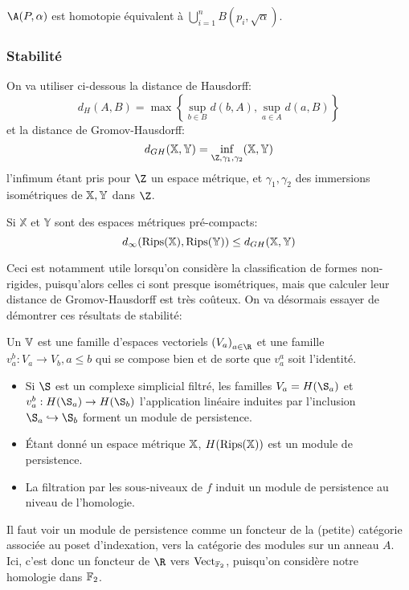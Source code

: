 \begin{thm}
	$\A(P, \alpha)$ est homotopie équivalent à $\bigcup_{i = 1}^{n} B(p_{i}, \sqrt{\alpha})$.
\end{thm}

\subsubsection{Stabilité}

On va utiliser ci-dessous la distance de Hausdorff:
\begin{equation*}
	d_{H}(A, B) = \max \left\{\sup_{b\in B} d(b, A), \sup_{a \in A} d(a, B)\right\}
\end{equation*}
et la distance de Gromov-Hausdorff:
\begin{equation*}
	d_{GH}(\X, \Y) = \inf_{\Z, \gamma_{1}, \gamma_{2}}(\X, \Y)
\end{equation*}
l'infimum étant pris pour $\Z$ un espace métrique, et $\gamma_{1}, \gamma_{2}$ des immersions isométriques de $\mathbb{X}, \mathbb{Y}$ dans $\Z$.


\begin{thm}
	Si $\mathbb{X}$ et $\mathbb{Y}$ sont des espaces métriques pré-compacts:
	\begin{equation*}
		d_{\infty}(\operatorname{Rips}(\mathbb{X}), \operatorname{Rips}(\mathbb{Y})) \leq d_{GH}(\mathbb{X}, \mathbb{Y})
	\end{equation*}
\end{thm}

Ceci est notamment utile lorsqu'on considère la classification de formes non-rigides, puisqu'alors celles
ci sont presque isométriques, mais que calculer leur distance de Gromov-Hausdorff est très coûteux.
On va désormais essayer de démontrer ces résultats de stabilité:
\begin{definition}
	Un  $\mathbb{V}$ est une famille d'espaces vectoriels $\left(V_{a}\right)_{a\in \R}$ et une famille $v_{a}^{b}: V_{a} \to V_{b}, a \leq b$ qui se compose bien et de sorte que $v_{a}^{a}$ soit l'identité.
\end{definition}
\begin{itemize}
	\item Si $\S$ est un complexe simplicial filtré, les familles $V_{a} = H(\S_{a})$ et $v_{a}^{b}: H(\S_{a}) \to H(\S_{b})$ l'application linéaire induites par l'inclusion $\S_{a} \hookrightarrow \S_{b}$ forment un module de persistence.
	\item Étant donné un espace métrique $\mathbb{X}$, $H(\operatorname{Rips}(\mathbb{X}))$ est un module de persistence.
	\item La filtration par les sous-niveaux de $f$ induit un module de persistence au niveau de l'homologie.
\end{itemize}
\begin{remarque}
	Il faut voir un module de persistence comme un foncteur de la (petite) catégorie associée au poset d'indexation, vers la catégorie des modules sur un anneau $A$.
	Ici, c'est donc un foncteur de $\R$ vers $\mathrm{Vect}_{\mathbb{F}_{2}}$, puisqu'on considère notre homologie dans $\mathbb{F}_{2}$.
\end{remarque}

